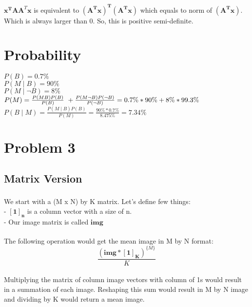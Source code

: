 \documentclass{article}
\newcommand{\matr}[1]{\mathbf{#1}}
\begin{document}
	\subsection{} %
	$\matr{{x}^{T}} \matr{A} \matr{A}^{T} \matr{x}$ is equivalent to $\matr{(A^{T}x)^{T}}\matr{(A^{T}x)}$ which equals to 
	norm of $\matr{(A^{T}x)}$. Which is always larger than 0. So, this is positive semi-definite.

\section {Probability}
	$P(B) = 0.7\%$\\
	$P(M \mid B) = 90\%$\\
	$P(M \mid \neg B) = 8\%$\\
	$P(M)  = \frac{P(MB) P(B)}{P(B)} \ + \frac{P(M \neg B) P(\neg B)}{P(\neg B)}  = 0.7\% * 90\% + 8\% * 99.3\%\\$
	$P(B \mid M)  = \frac{P(M \mid B) P(B)}{P(M)} = \frac{90\% * 0.7\%}{8.475\%} = \mathbf{7.34\%}$

\section {Problem 3}
	\subsection{Matrix Version} %
		\subsubsection{} %

		We start with a (M x N) by K matrix. Let's define few things:\\
		- $\matr{[1]_{n}}$ is a column vector with a size of n.\\
		- Our image matrix is called $\matr{img}$\\
		\\
		The following operation would get the mean image in M by N format:\\	
		\begin{equation*}
		\frac{(\matr{img}*\matr{[1]_{K}})^{\{M\}}}{K}
		\end{equation*}
		\\
		Multiplying the matrix of column image vectors with column of 1s would result in a summation of each image.
		Reshaping this sum would result in M by N image and dividing by K would return a mean image.
		\\
\end{document}
